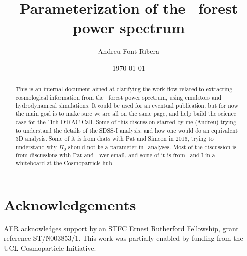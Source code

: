 \documentclass[preprintnumbers,prd,superscriptaddress,notitlepage,nofootinbib] {revtex4-1}
\begin{document}
\title{Parameterization of the \lya\ forest power spectrum}

\author{Andreu Font-Ribera} %

\date{\today}

\begin{abstract}
This is an internal document aimed at clarifying the work-flow related to extracting cosmological information 
from the \lya\ forest power spectrum, using emulators and hydrodynamical simulations.
It could be used for an eventual publication, but for now the main goal is to make sure we are all on the
same page, and help build the science case for the 11th DiRAC Call.
Some of this discussion started by me (Andreu) trying to understand the details of the SDSS-I analysis, 
and how one would do an equivalent 3D analysis. 
Some of it is from chats with Pat and Simeon in 2016, trying to understand why $H_0$ should not be a
parameter in \lya\ analyses. 
Most of the discussion is from discussions with Pat and \anze\ over email, 
and some of it is from \anze\ and I in a whiteboard at the Cosmoparticle hub.
\end{abstract}

\maketitle











%

%

%

\section*{Acknowledgements}
AFR acknowledges support by an STFC Ernest Rutherford Fellowship, grant reference ST/N003853/1.
This work was partially enabled by funding from the UCL Cosmoparticle
Initiative.




\appendix

\newpage

\end{document}
